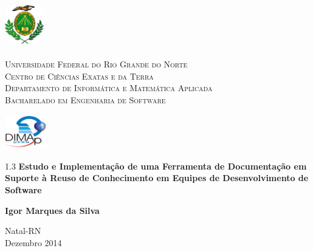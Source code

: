 
\begin{titlepage}
	\begin{center}
		
		\begin{minipage}{2cm}
			\begin{center}
				\includegraphics[width=1.7cm, height=2.0cm]{Imagens/Brasao-UFRN.jpg}
			\end{center}
		\end{minipage}
		\begin{minipage}{11cm}
			\begin{center}
				\begin{espacosimples}
					{\small \textsc{Universidade Federal do Rio Grande do Norte}			\\
							  \textsc{Centro de Ciências Exatas e da Terra}						\\
							  \textsc{Departamento de Informática e Matemática Aplicada}	\\
							  \textsc{Bacharelado em Engenharia de Software}}
				\end{espacosimples}
			\end{center}
		\end{minipage}
		\begin{minipage}{2cm}
			\begin{center}
				\includegraphics[width=1.8cm, height=1.5cm]{Imagens/Logotipo-DIMAp.jpg}
			\end{center}
		\end{minipage}
			
		\vspace{5cm}
						
		{\setlength{\baselineskip}%
		{1.3\baselineskip}
		{\LARGE \textbf{Estudo e Implementação de uma Ferramenta de Documentação em Suporte à Reuso de Conhecimento em Equipes de Desenvolvimento de Software}}\par}
			
		\vspace{4cm}
			
		{\large \textbf{Igor Marques da Silva}}
						
		\vspace{7cm}
		
		Natal-RN\\Dezembro 2014
	\end{center}
\end{titlepage}